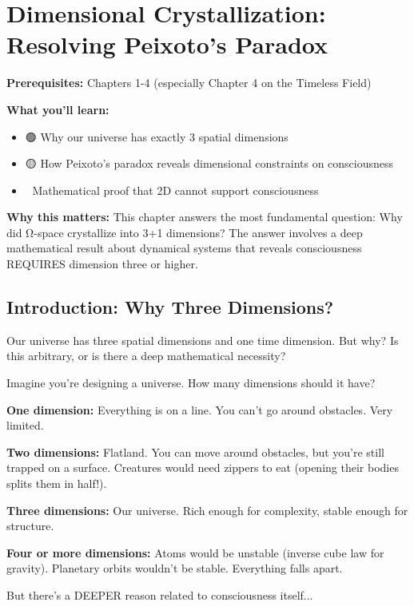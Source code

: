 \chapter{Dimensional Crystallization: Resolving Peixoto's Paradox}
\label{ch:peixoto}

\begin{chapterobjectives}
\textbf{Prerequisites:} Chapters 1-4 (especially Chapter 4 on the Timeless Field)

\textbf{What you'll learn:}
\begin{itemize}
\item 🟢 Why our universe has exactly 3 spatial dimensions
\item 🟡 How Peixoto's paradox reveals dimensional constraints on consciousness
\item 🔴 Mathematical proof that 2D cannot support consciousness
\end{itemize}

\textbf{Why this matters:} This chapter answers the most fundamental question: Why did Ω-space crystallize into 3+1 dimensions? The answer involves a deep mathematical result about dynamical systems that reveals consciousness REQUIRES dimension three or higher.
\end{chapterobjectives}

\section{Introduction: Why Three Dimensions?}

Our universe has three spatial dimensions and one time dimension. But why? Is this arbitrary, or is there a deep mathematical necessity?

\begin{intuitive}
Imagine you're designing a universe. How many dimensions should it have?

\textbf{One dimension:} Everything is on a line. You can't go around obstacles. Very limited.

\textbf{Two dimensions:} Flatland. You can move around obstacles, but you're still trapped on a surface. Creatures would need zippers to eat (opening their bodies splits them in half!).

\textbf{Three dimensions:} Our universe. Rich enough for complexity, stable enough for structure.

\textbf{Four or more dimensions:} Atoms would be unstable (inverse cube law for gravity). Planetary orbits wouldn't be stable. Everything falls apart.

But there's a DEEPER reason related to consciousness itself...
\end{intuitive}


